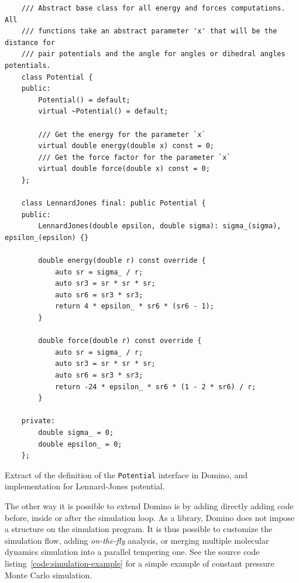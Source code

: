\documentclass[thesis]{subfiles}
\begin{document}
\begin{listing}[ht]
    \begin{verbatim}
    /// Abstract base class for all energy and forces computations. All
    /// functions take an abstract parameter 'x' that will be the distance for
    /// pair potentials and the angle for angles or dihedral angles potentials.
    class Potential {
    public:
        Potential() = default;
        virtual ~Potential() = default;

        /// Get the energy for the parameter `x`
        virtual double energy(double x) const = 0;
        /// Get the force factor for the parameter `x`
        virtual double force(double x) const = 0;
    };

    class LennardJones final: public Potential {
    public:
        LennardJones(double epsilon, double sigma): sigma_(sigma), epsilon_(epsilon) {}

        double energy(double r) const override {
            auto sr = sigma_ / r;
            auto sr3 = sr * sr * sr;
            auto sr6 = sr3 * sr3;
            return 4 * epsilon_ * sr6 * (sr6 - 1);
        }

        double force(double r) const override {
            auto sr = sigma_ / r;
            auto sr3 = sr * sr * sr;
            auto sr6 = sr3 * sr3;
            return -24 * epsilon_ * sr6 * (1 - 2 * sr6) / r;
        }

    private:
        double sigma_ = 0;
        double epsilon_ = 0;
    };
    \end{verbatim}
    \caption{Extract of the definition of the \texttt{Potential} interface in
    Domino, and implementation for Lennard-Jones potential.}
    \label{code:potential}
\end{listing}

The other way it is possible to extend Domino is by adding directly adding code
before, inside or after the simulation loop. As a library, Domino does not
impose a structure on the simulation program. It is thus possible to customize
the simulation flow, adding \emph{on-the-fly} analysis, or merging multiple
molecular dynamics simulation into a parallel tempering one. See the source code
listing~\ref{code:simulation-example} for a simple example of constant pressure
Monte Carlo simulation.
\end{document}
